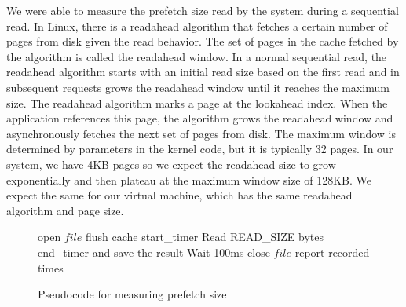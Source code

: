 We were able to measure the prefetch size read by the system during a sequential 
read. In Linux, there is a readahead algorithm that fetches a certain number of 
pages from disk given the read behavior. The set of pages in the cache fetched by 
the algorithm is called the readahead window. In a normal sequential read, the 
readahead algorithm starts with an initial read size based on the first read and in
subsequent requests grows the readahead window until it reaches the maximum size. 
The readahead algorithm marks a page at the lookahead index. When the application 
references this page, the algorithm grows the readahead window and asynchronously 
fetches the next set of pages from disk. The maximum window is determined by 
parameters in the kernel code, but it is typically 32 pages. In our system, we have
4KB pages so we expect the readahead size to grow exponentially and then plateau at
the maximum window size of 128KB. We expect the same for our virtual machine, which has the same readahead algorithm and page size.

\begin{figure}[t!]
	\begin{algorithmic}
		\STATE open $file$
		\STATE flush cache
		\STATE start\_timer
		\STATE Read READ\_SIZE bytes
		\STATE end\_timer and save the result
		\STATE Wait 100ms
		\ENDFOR
		\STATE close $file$
		\STATE report recorded times
	\end{algorithmic}
	\caption{Pseudocode for measuring prefetch size}
	\label{fig:p2_code}
\end{figure}

